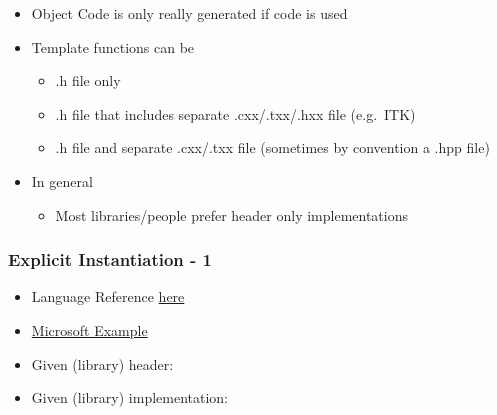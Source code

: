 \begin{itemize}
\itemsep1pt\parskip0pt
\item
  Object Code is only really generated if code is used
\item
  Template functions can be

  \begin{itemize}
  \itemsep1pt\parskip0pt
  \item
    .h file only
  \item
    .h file that includes separate .cxx/.txx/.hxx file (e.g.~ITK)
  \item
    .h file and separate .cxx/.txx file (sometimes by convention a .hpp
    file)
  \end{itemize}
\item
  In general

  \begin{itemize}
  \itemsep1pt\parskip0pt
  \item
    Most libraries/people prefer header only implementations
  \end{itemize}
\end{itemize}

\subsubsection{Explicit Instantiation -
1}\label{explicit-instantiation---1}

\begin{itemize}
\item
  Language Reference
  \href{http://en.cppreference.com/w/cpp/language/function_template}{here}
\item
  \href{http://msdn.microsoft.com/en-us/library/by56e477\%28VS.80\%29.aspx}{Microsoft
  Example}
\item
  Given (library) header:
\end{itemize}

\begin{Shaded}
\begin{Highlighting}[]
\NormalTok{<}  
\end{Highlighting}
\end{Shaded}

\begin{itemize}
\itemsep1pt\parskip0pt
\item
  Given (library) implementation:
\end{itemize}

